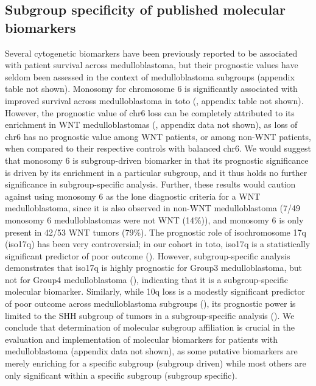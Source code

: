 \clearpage

\subsection{Subgroup specificity of published molecular biomarkers}

Several cytogenetic biomarkers have been previously reported to be associated with patient survival across medulloblastoma, but their prognostic values have seldom been assessed in the context of medulloblastoma subgroups (appendix table not shown). Monosomy for chromosome 6 is significantly associated with improved survival across medulloblastoma in toto (, appendix table not shown). However, the prognostic value of chr6 loss can be completely attributed to its enrichment in WNT medulloblastomas (, appendix data not shown), as loss of chr6 has no prognostic value among WNT patients, or among non-WNT patients, when compared to their respective controls with balanced chr6.  We would suggest that monosomy 6 is subgroup-driven biomarker in that its prognostic significance is driven by its enrichment in a particular subgroup, and it thus holds no further significance in subgroup-specific analysis.  Further, these results would caution against using monosomy 6 as the lone diagnostic criteria for a WNT medulloblastoma, since it is also observed in non-WNT medulloblastoma (7/49 monosomy 6 medulloblastomas were not WNT (14\%)), and monosomy 6 is only present in 42/53 WNT tumors (79\%).  The prognostic role of isochromosome 17q (iso17q) has been very controversial; in our cohort in toto, iso17q is a statistically significant predictor of poor outcome ().  However, subgroup-specific analysis demonstrates that iso17q is highly prognostic for Group3 medulloblastoma, but not for Group4 medulloblastoma (), indicating that it is a subgroup-specific molecular biomarker.  Similarly, while 10q loss is a modestly significant predictor of poor outcome across medulloblastoma subgroups (), its prognostic power is limited to the SHH subgroup of tumors in a subgroup-specific analysis ().  We conclude that determination of molecular subgroup affiliation is crucial in the evaluation and implementation of molecular biomarkers for patients with medulloblastoma (appendix data not shown), as some putative biomarkers are merely enriching for a specific subgroup (subgroup driven) while most others are only significant within a specific subgroup (subgroup specific).

